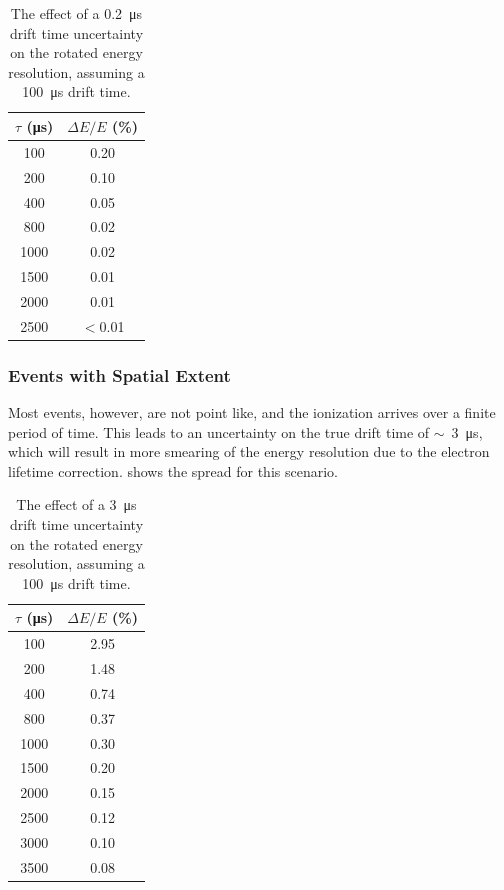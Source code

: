 \documentclass[herrin-thesis.tex]{subfiles}
\begin{document}
\begin{table}[htd]
\centering
\caption[Drift time uncertainty effect on resolution]{The effect of a \SI{0.2}{\micro\second} drift time uncertainty on the rotated energy resolution, assuming a \SI{100}{\micro\second} drift time.}
\label{tab:el_res_dt_ideal}
\begin{tabular}{c|c}
	\(\tau\) (\si{\micro\second})	&	\(\Delta E / E\) (\%) 	\\ \hline
	100					&	0.20				\\
	200					&	0.10				\\
	400					&	0.05				\\
	800					&	0.02				\\
	1000					&	0.02				\\
	1500					&	0.01				\\
	2000					&	0.01				\\
	2500					&	\(<\)0.01			
\end{tabular}
\end{table}

\subsubsection{Events with Spatial Extent}
Most events, however, are not point like, and the ionization arrives over a finite period of time. This leads to an uncertainty on the true drift time of \(\sim\)~\SI{3}{\micro\second}, which will result in more smearing of the energy resolution due to the electron lifetime correction.  shows the spread for this scenario.

\begin{table}[htd]
\centering
\caption[Drift time uncertainty effect on resolution]{The effect of a \SI{3}{\micro\second} drift time uncertainty on the rotated energy resolution, assuming a \SI{100}{\micro\second} drift time.}
\label{tab:el_res_dt}
\begin{tabular}{c|c}
	\(\tau\) (\si{\micro\second})	&	\(\Delta E / E\) (\%) 	\\ \hline
	100					&	2.95				\\
	200					&	1.48				\\
	400					&	0.74				\\
	800					&	0.37				\\
	1000					&	0.30				\\
	1500					&	0.20				\\
	2000					&	0.15				\\
	2500					&	0.12				\\
	3000					&	0.10				\\
	3500					&	0.08
\end{tabular}
\end{table}
\end{document}
